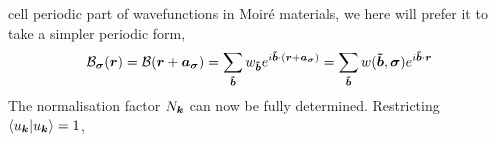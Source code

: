 \documentclass[%
nofootinbib,
 amsmath,amssymb,
 aps,onecolumn,
prb
]{revtex4-2}
\newcommand{\mB}{\mathcal{B}}
\newcommand{\vsig}{\vb*{\sigma}}
\begin{document}
cell periodic part of wavefunctions in Moir\'e materials, we here will prefer it to take a simpler periodic form, 
\begin{equation}
    \mB_{\vsig}(\vb*{r})=\mB(\vb*{r}+\vb*{a}_{\vsig})=\sum_{\vb*{\tilde{b}}}w_{\vb*{\tilde{b}}}e^{i\vb*{\tilde{b}}\cdot(\vb*{r}+\vb*{a}_{\vsig})}=\sum_{\vb*{\tilde{b}}}w(\vb*{\tilde{b}},\vsig)e^{i\vb*{\tilde{b}}\cdot\vb*{r}}
\end{equation}
The normalisation factor $N_{\vb*{k}}$ can now be fully determined. Restricting $\langle u_{\vb*{k}}|  u_{\vb*{k}}\rangle=1$,

\end{document}
